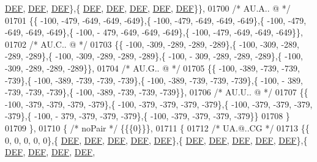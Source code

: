 \begin{DoxyCode}
      \mbox{\hyperlink{1_88_84__epars_8h_a397419fc12b37ed479c8abb9d444d843}{DEF}},  \mbox{\hyperlink{1_88_84__epars_8h_a397419fc12b37ed479c8abb9d444d843}{DEF}},  \mbox{\hyperlink{1_88_84__epars_8h_a397419fc12b37ed479c8abb9d444d843}{DEF}}\},\{  \mbox{\hyperlink{1_88_84__epars_8h_a397419fc12b37ed479c8abb9d444d843}{DEF}},  \mbox{\hyperlink{1_88_84__epars_8h_a397419fc12b37ed479c8abb9d444d843}{DEF}},  \mbox{\hyperlink{1_88_84__epars_8h_a397419fc12b37ed479c8abb9d444d843}{DEF}},  \mbox{\hyperlink{1_88_84__epars_8h_a397419fc12b37ed479c8abb9d444d843}{DEF}},  \mbox{\hyperlink{1_88_84__epars_8h_a397419fc12b37ed479c8abb9d444d843}{DEF}}\}\},
01700 \textcolor{comment}{/* AU.A.. @ */}
01701 \{\{ -100, -479, -649, -649, -649\},\{ -100, -479, -649, -649, -649\},\{ -100, -479, -649, -649, -649\},\{ -100, -
      479, -649, -649, -649\},\{ -100, -479, -649, -649, -649\}\},
01702 \textcolor{comment}{/* AU.C.. @ */}
01703 \{\{ -100, -309, -289, -289, -289\},\{ -100, -309, -289, -289, -289\},\{ -100, -309, -289, -289, -289\},\{ -100, -
      309, -289, -289, -289\},\{ -100, -309, -289, -289, -289\}\},
01704 \textcolor{comment}{/* AU.G.. @ */}
01705 \{\{ -100, -389, -739, -739, -739\},\{ -100, -389, -739, -739, -739\},\{ -100, -389, -739, -739, -739\},\{ -100, -
      389, -739, -739, -739\},\{ -100, -389, -739, -739, -739\}\},
01706 \textcolor{comment}{/* AU.U.. @ */}
01707 \{\{ -100, -379, -379, -379, -379\},\{ -100, -379, -379, -379, -379\},\{ -100, -379, -379, -379, -379\},\{ -100, -
      379, -379, -379, -379\},\{ -100, -379, -379, -379, -379\}\}
01708 \}
01709 \},
01710 \{ \textcolor{comment}{/* noPair */} \{\{\{0\}\}\},
01711 \{
01712 \textcolor{comment}{/* UA.@..CG */}
01713 \{\{    0,    0,    0,    0,    0\},\{  \mbox{\hyperlink{1_88_84__epars_8h_a397419fc12b37ed479c8abb9d444d843}{DEF}},  \mbox{\hyperlink{1_88_84__epars_8h_a397419fc12b37ed479c8abb9d444d843}{DEF}},  \mbox{\hyperlink{1_88_84__epars_8h_a397419fc12b37ed479c8abb9d444d843}{DEF}},  \mbox{\hyperlink{1_88_84__epars_8h_a397419fc12b37ed479c8abb9d444d843}{DEF}},  \mbox{\hyperlink{1_88_84__epars_8h_a397419fc12b37ed479c8abb9d444d843}{DEF}}\},\{  
      \mbox{\hyperlink{1_88_84__epars_8h_a397419fc12b37ed479c8abb9d444d843}{DEF}},  \mbox{\hyperlink{1_88_84__epars_8h_a397419fc12b37ed479c8abb9d444d843}{DEF}},  \mbox{\hyperlink{1_88_84__epars_8h_a397419fc12b37ed479c8abb9d444d843}{DEF}},  \mbox{\hyperlink{1_88_84__epars_8h_a397419fc12b37ed479c8abb9d444d843}{DEF}},  \mbox{\hyperlink{1_88_84__epars_8h_a397419fc12b37ed479c8abb9d444d843}{DEF}}\},\{  \mbox{\hyperlink{1_88_84__epars_8h_a397419fc12b37ed479c8abb9d444d843}{DEF}},  \mbox{\hyperlink{1_88_84__epars_8h_a397419fc12b37ed479c8abb9d444d843}{DEF}},  \mbox{\hyperlink{1_88_84__epars_8h_a397419fc12b37ed479c8abb9d444d843}{DEF}},  \mbox{\hyperlink{1_88_84__epars_8h_a397419fc12b37ed479c8abb9d444d843}{DEF}},  

\end{DoxyCode}
